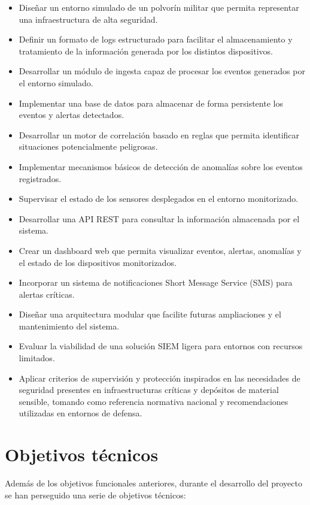 \begin{itemize}
\item Diseñar un entorno simulado de un polvorín militar que permita representar una infraestructura de alta seguridad.
\item Definir un formato de logs estructurado para facilitar el almacenamiento y tratamiento de la información generada por los distintos dispositivos.
\item Desarrollar un módulo de ingesta capaz de procesar los eventos generados por el entorno simulado.
\item Implementar una base de datos para almacenar de forma persistente los eventos y alertas detectados.
\item Desarrollar un motor de correlación basado en reglas que permita identificar situaciones potencialmente peligrosas.
\item Implementar mecanismos básicos de detección de anomalías sobre los eventos registrados.
\item Supervisar el estado de los sensores desplegados en el entorno monitorizado.
\item Desarrollar una API REST para consultar la información almacenada por el sistema.
\item Crear un dashboard web que permita visualizar eventos, alertas, anomalías y el estado de los dispositivos monitorizados.
\item Incorporar un sistema de notificaciones Short Message Service (SMS) para alertas críticas.
\item Diseñar una arquitectura modular que facilite futuras ampliaciones y el mantenimiento del sistema.
\item Evaluar la viabilidad de una solución SIEM ligera para entornos con recursos limitados.
\item Aplicar criterios de supervisión y protección inspirados en las necesidades de seguridad presentes en infraestructuras críticas y depósitos de material sensible, tomando como referencia normativa nacional y recomendaciones utilizadas en entornos de defensa.
\end{itemize}

\section{Objetivos técnicos}
Además de los objetivos funcionales anteriores, durante el desarrollo del proyecto se han perseguido una serie de objetivos técnicos:

